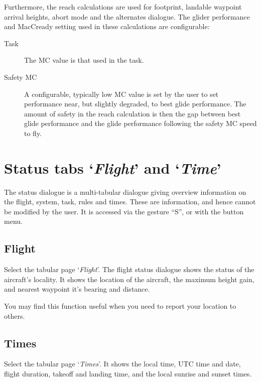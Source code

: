 Furthermore, the reach calculations are used for footprint, landable
waypoint arrival heights, abort mode and the alternates dialogue.  The glider
performance and MacCready setting used in these calculations are configurable:
\begin{description}
\item[Task] The MC value is that used in the task.
\item[Safety MC] A configurable, typically low MC value is set by the user to set
  performance near, but slightly degraded, to best glide performance. The amount of safety 
  in the reach calculation is then the gap between best glide performance and the glide
  performance following the safety MC speed to fly. 
\end{description}

\section{Status tabs `\emph{Flight}' and `\emph{Time}'}\label{sec:flight-status}

The status dialogue is a multi-tabular dialogue giving overview information on the 
flight, system, task, rules and times.
These are information, and hence cannot be modified by the user.
It is accessed via the gesture ``S'', or with the button menu.
\begin{quote}
\blink{}
\end{quote}

\subsection*{Flight}
Select the tabular page `\emph{Flight}'. 
The flight status dialogue shows the status of the aircraft's locality.
It shows the location of the aircraft, the
maximum height gain, and nearest waypoint it's bearing and distance.

You may find this function useful when you need to report your
location to others.

\subsection*{Times}\label{sec:time-status}
Select the tabular page `\emph{Times}'. 
It shows the local time, UTC time and date, flight duration, takeoff and landing time, and
the local sunrise and sunset times.

